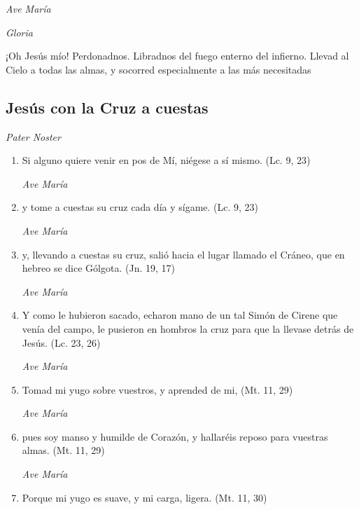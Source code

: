 \documentclass[a4paper,11pt, oneside]{report}
\begin{document}
        \textit{Ave María} \par
        \indent\textit{Gloria} \par
        \indent¡Oh Jesús mío! Perdonadnos. Libradnos del fuego enterno del infierno. Llevad al Cielo a todas las almas, y socorred especialmente a las más 
        necesitadas

      \subsection*{Jesús con la Cruz a cuestas}
      
        \textit{Pater Noster}

        \begin{enumerate}
          
          \item Si alguno quiere venir en pos de Mí, niégese a sí mismo. (Lc. 9, 23)

          \textit{Ave María}

          \item y tome a cuestas su cruz cada día y sígame. (Lc. 9, 23)

          \textit{Ave María}

          \item y, llevando a cuestas su cruz, salió hacia el lugar llamado el Cráneo, que en hebreo se dice Gólgota. (Jn. 19, 17)

          \textit{Ave María}

          \item Y como le hubieron sacado, echaron mano de un tal Simón de Cirene que venía del campo, le pusieron en hombros la cruz para que la llevase
          detrás de Jesús. (Lc. 23, 26)

          \textit{Ave María}

          \item Tomad mi yugo sobre vuestros, y aprended de mi, (Mt. 11, 29)

          \textit{Ave María}

          \item pues soy manso y humilde de Corazón, y hallaréis reposo para vuestras almas. (Mt. 11, 29)

          \textit{Ave María}

          \item Porque mi yugo es suave, y mi carga, ligera. (Mt. 11, 30)


\end{enumerate}
\end{document}

